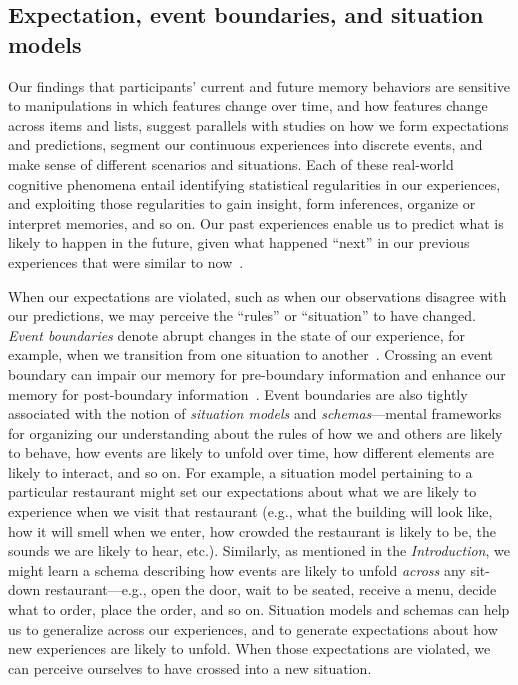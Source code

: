 \documentclass[11pt]{article}
\begin{document}
\subsection*{Expectation, event boundaries, and situation models}

Our findings that participants' current and future memory behaviors are
sensitive to manipulations in which features change over time, and how features
change across items and lists, suggest parallels with studies on how we form
expectations and predictions, segment our continuous experiences into discrete
events, and make sense of different scenarios and situations. Each of these
real-world cognitive phenomena entail identifying statistical regularities in
our experiences, and exploiting those regularities to gain insight, form
inferences, organize or interpret memories, and so on. Our past experiences
enable us to predict what is likely to happen in the future, given what
happened ``next'' in our previous experiences that were similar to
now~\citep{Mann20, EichFort09, BarrEtal20, Brig12, ChowEtal16, GlucEtal02,
GoldEtal21, GrifStey03, JonePash07, KimEtal14, TamiThor18, XuEtal23}.

When our expectations are violated, such as when our observations disagree with
our predictions, we may perceive the ``rules'' or ``situation'' to have
changed. \textit{Event boundaries} denote abrupt changes in the state of our
experience, for example, when we transition from one situation to
another~\citep{RadvZack17, ZwaaRadv98}. Crossing an event boundary can impair
our memory for pre-boundary information and enhance our memory for
post-boundary information~\citep{RadvCope06, SahaKell02, MannEtal16,
DuBrDava13}. Event boundaries are also tightly associated with the notion of
\textit{situation models} and \textit{schemas}---mental frameworks for
organizing our understanding about the rules of how we and others are likely to
behave, how events are likely to unfold over time, how different elements are
likely to interact, and so on. For example, a situation model pertaining to a
particular restaurant might set our expectations about what we are likely to
experience when we visit that restaurant (e.g., what the building will look
like, how it will smell when we enter, how crowded the restaurant is likely to
be, the sounds we are likely to hear, etc.). Similarly, as mentioned in the
\textit{Introduction}, we might learn a schema describing how events are likely
to unfold \textit{across} any sit-down restaurant---e.g., open the door, wait
to be seated, receive a menu, decide what to order, place the order, and so on.
Situation models and schemas can help us to generalize across our experiences,
and to generate expectations about how new experiences are likely to unfold.
When those expectations are violated, we can perceive ourselves to have crossed
into a new situation.
\end{document}
